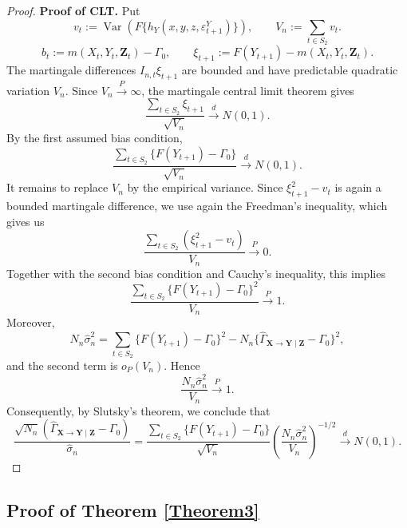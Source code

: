 \documentclass[a4paper,11pt]{article}
\begin{document}
\begin{proof}
\textbf{Proof of CLT. }Put 
\[
v_t:= \operatorname{Var}\!\left( F\{h_Y(x,y,z,\varepsilon^Y_{t+1})\} \right),
    \qquad
    V_n:=\sum_{t\in S_2}v_t .
\]
\[
    b_t:=m(X_t,Y_t,\mathbf Z_t)-\Gamma_0,     \qquad
   \xi_{t+1}:=F(Y_{t+1})-m(X_t,Y_t,\mathbf Z_t).
\]The martingale differences \(I_{n,t}\xi_{t+1}\) are bounded and have predictable quadratic
variation \(V_n\). Since \(V_n\overset{P}{\to}\infty\), the martingale central limit theorem
gives
\[
    \frac{\sum_{t\in S_2}\xi_{t+1}}{\sqrt{V_n}}
    \overset{d}{\to}
    N(0,1).
\]
By the first assumed bias condition,
\[
    \frac{\sum_{t\in S_2}\{F(Y_{t+1})-\Gamma_0\}}{\sqrt{V_n}}
    \overset{d}{\to}
    N(0,1).
\]
It remains to replace \(V_n\) by the empirical variance. Since
\(\xi_{t+1}^2-v_t\) is again a bounded martingale difference, we use again the Freedman's inequality, which gives us
\[
    \frac{\sum_{t\in S_2}(\xi_{t+1}^2-v_t)}{V_n}
    \overset{P}{\to}0.
\]
Together with the second bias condition and Cauchy's inequality, this implies
\[
    \frac{\sum_{t\in S_2}\{F(Y_{t+1})-\Gamma_0\}^2}{V_n}
    \overset{P}{\to}1.
\]
Moreover,
\[
    N_n\widehat\sigma_n^2
    =
    \sum_{t\in S_2}\{F(Y_{t+1})-\Gamma_0\}^2
    -
    N_n\{\widehat\Gamma_{\mathbf X\to\mathbf Y\mid\mathbf Z}-\Gamma_0\}^2,
\]
and the second term is \(o_P(V_n)\). Hence
\[
    \frac{N_n\widehat\sigma_n^2}{V_n}\overset{P}{\to}1.
\]
Consequently, by Slutsky's theorem, we conclude that
\[
    \frac{\sqrt{N_n}
    \left(
        \widehat\Gamma_{\mathbf X\to\mathbf Y\mid\mathbf Z}
        -
        \Gamma_0
    \right)}
    {\widehat\sigma_n}
    =
    \frac{
        \sum_{t\in S_2}\{F(Y_{t+1})-\Gamma_0\}
    }{\sqrt{V_n}}
    \left(
        \frac{N_n\widehat\sigma_n^2}{V_n}
    \right)^{-1/2}
    \overset{d}{\to}
    N(0,1).
\]
\end{proof}





\newpage
\subsection{Proof of Theorem \ref{Theorem3}} \label{proof_of_thm3}
\end{document}
